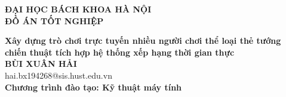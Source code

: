 \documentclass[Project.tex]{subfiles}
\begin{document}
\thispagestyle{empty}
\begin{center}

{\textbf{\large{ĐẠI HỌC BÁCH KHOA HÀ NỘI}}}\\[2.5cm]

{\textbf{\huge{ ĐỒ ÁN TỐT NGHIỆP}}}\\[0.8cm]
{\textbf{\Large{Xây dựng trò chơi trực tuyến nhiều người chơi thể loại thẻ tướng chiến thuật tích hợp hệ thống xếp hạng thời gian thực}}\\[0.8cm]

{\textbf{\large{BÙI XUÂN HẢI}}}\\
{\large{hai.bx194268@sis.hust.edu.vn}}\\[0.5cm]

{\textbf{\large{Chương trình đào tạo: Kỹ thuật máy tính
}}}\\

\vspace{2.5cm}
\begin{table}[H]
\centering
{}
\end{table}}
\end{center}



\newpage
\end{document}
